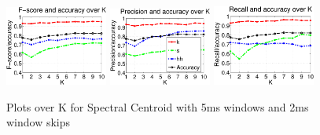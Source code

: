 \begin{figure}


	\centering\includegraphics[width=0.3\textwidth]{scentroid52FP.png}
	\centering\includegraphics[width=0.3\textwidth]{scentroid52_P.png}
	\centering\includegraphics[width=0.3\textwidth]{scentroid52_R.png}
		
		\caption{Plots over K for Spectral Centroid with 5ms windows and 2ms window skips}
\end{figure}\clearpage

